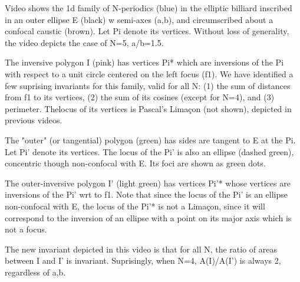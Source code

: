Video shows the 1d family of N-periodics (blue) in the elliptic billiard inscribed in an outer ellipse E (black) w semi-axes (a,b), and circumscribed about a confocal caustic (brown). Let Pi denote its vertices. Without loss of generality, the video depicts the case of N=5, a/b=1.5.

The inversive polygon I (pink) has vertices Pi* which are inversions of the Pi with respect to a unit circle centered on the left focus (f1). We have identified a few suprising invariants for this family, valid for all N: (1) the sum of distances from f1 to its vertices, (2) the sum of its cosines (except for N=4), and (3) perimeter. Thelocus of its vertices is Pascal's Limaçon (not shown), depicted in previous videos.

The "outer" (or tangential) polygon (green) has sides are tangent to E at the Pi. Let Pi' denote its vertices. The locus of the Pi' is also an ellipse (dashed green), concentric though non-confocal with E. Its foci are shown as green dots.

The outer-inversive polygon I' (light green) has vertices Pi'* whose vertices are inversions of the Pi' wrt to f1. Note that since the locus of the Pi' is an ellipse non-confocal with E, the locus of the Pi'* is not a Limaçon, since it will correspond to the inversion of an ellipse with a point on its major axis which is not a focus.

The new invariant depicted in this video is that for all N, the ratio of areas between I and I' is invariant. Suprisingly, when N=4, A(I)/A(I') is always 2, regardless of a,b.